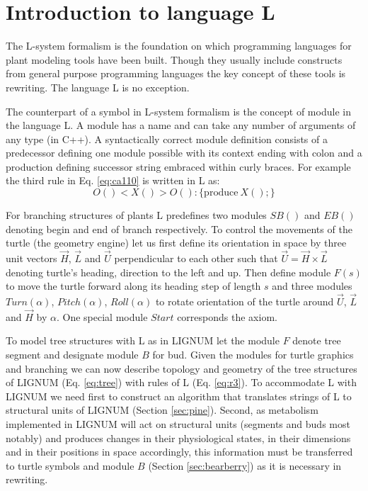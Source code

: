 \section{Introduction to language L}

The  L-system  formalism  is   the  foundation  on  which  programming
languages  for  plant modeling  tools  have  been  built. Though  they
usually include constructs  from general purpose programming languages
the key  concept of  these tools  is rewriting. The  language L  is no
exception.

The counterpart  of a symbol in  L-system formalism is  the concept of
module in the language L. A module  has a name and can take any number
of arguments  of any  type (in C++).   A syntactically  correct module
definition consists of a predecessor defining one module possible with
its  context ending  with colon  and a  production  defining successor
string embraced  within curly braces.   For example the third  rule in
Eq. \ref{eq:ca110} is written in L as:
\begin{equation}\label{eq:r3}
 O() < X() > O(): \{\mathrm{produce}\ X();\}
\end{equation}

For branching structures of plants L predefines two modules $SB()$ and
$EB()$ denoting begin and end  of branch respectively.  To control the
movements of the turtle (the  geometry engine) let us first define its
orientation  in space by  three unit  vectors $\vec  H$, $\vec  L$ and
$\vec U$ perpendicular to each other such that $\vec U = \vec H \times
\vec L$ denoting turtle's heading,  direction to the left and up. Then
define module $F(s)$ to move the turtle forward along its heading step
of  length  $s$  and  three modules  $Turn(\alpha)$,  $Pitch(\alpha)$,
$Roll(\alpha)$ to  rotate orientation of  the turtle around  $\vec U$,
$\vec  L$  and $\vec  H$  by  $\alpha$.   One special  module  $Start$
corresponds the axiom.

To model tree structures with L as in LIGNUM let the module $F$ denote
tree segment and designate module  $B$ for bud.  Given the modules for
turtle  graphics  and  branching  we  can now  describe  topology  and
geometry of  the tree structures  of LIGNUM (Eq.   \ref{eq:tree}) with
rules of  L (Eq.  \ref{eq:r3}). To  accommodate L with  LIGNUM we need
first  to construct  an  algorithm  that translates  strings  of L  to
structural  units  of  LIGNUM  (Section \ref{sec:pine}).   Second,  as
metabolism  implemented  in  LIGNUM   will  act  on  structural  units
(segments  and  buds  most  notably)  and produces  changes  in  their
physiological states,  in their dimensions  and in their  positions in
space  accordingly, this  information  must be  transferred to  turtle
symbols  and  module  $B$   (Section  \ref{sec:bearberry})  as  it  is
necessary in rewriting.

